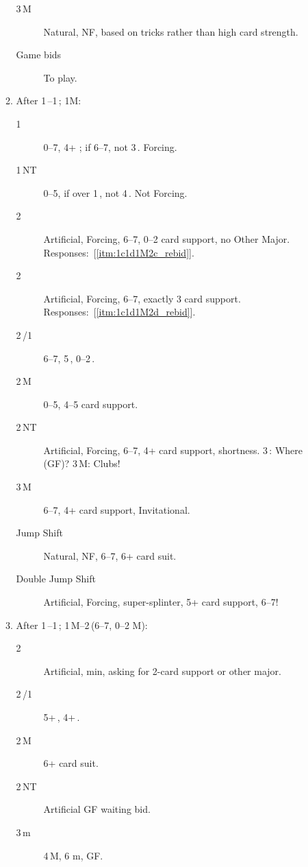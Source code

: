 \documentclass[12pt]{article}
\begin{document}
\begin{footnotesize}
\begin{enumerate}
\begin{enumerate}[label*=\arabic*,nosep]
\begin{description}
                \item [3\,M] Natural, NF, based on tricks rather than high card strength.
                \item [Game bids] To play.
            \end{description}
            \item \label{itm:1c1d1M_resp} After 1\,\bc--1\,\rd; 1M:
            \begin{description}
                \item [1\,\bs] 0--7, 4+ \bs; if 6--7, not 3\,\rh.
                    Forcing.
                \item [1\,NT] 0--5, if over 1\,\rh, not 4\,\bs.
                    Not Forcing.
                \item [2\,\bc] Artificial, Forcing, 6--7, 0--2 card support, no Other Major.
                    Responses:~[\ref{itm:1c1d1M2c_rebid}].
                \item [2\,\rd] Artificial, Forcing, 6--7, exactly 3 card support.
                    Responses:~[\ref{itm:1c1d1M2d_rebid}].
                \item [2\,\rh/1\,\bs] 6--7, 5\,\rh, 0--2\,\bs.
                \item [2\,M] 0--5, 4--5 card support.
                \item [2\,NT] Artificial, Forcing, 6--7, 4+ card support, shortness.
                    3\,\bc: Where (GF)?
                    3\,M: Clubs!
                \item[3\,M] 6--7, 4+ card support, Invitational.
                \item[Jump Shift] Natural, NF, 6--7, 6+ card suit.
                \item[Double Jump Shift] Artificial, Forcing, super-splinter, 5+ card support, 6--7!
            \end{description}
            \item \label{itm:1c1d1M2c_rebid} After 1\,\bc--1\,\rd; 1\,M--2\,\bc (6--7, 0--2 M):
            \begin{description}
                \item [2\,\rd] Artificial, min, asking for 2-card support or other major.
                \item [2\,\rh/1\,\bs] 5+\,\bs, 4+\,\rh.
                \item [2\,M] 6+ card suit.
                \item [2\,NT] Artificial GF waiting bid.
                \item [3\,m] 4\,M, 6 m, GF\@.

\end{description}
\end{enumerate}
\end{enumerate}
\end{footnotesize}
\end{document}

